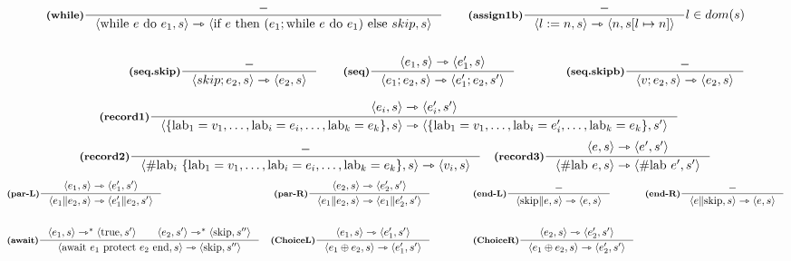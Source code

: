 \documentclass[a4paper, 10pt]{article}
\newcommand{\infer}[4]{\inference[\textbf{#1}]{#2}{#3}#4 }
\newcommand{\srule}[2]{\langle #1 \rangle \rightarrowtriangle \langle #2 \rangle}
\newcommand{\ssrule}[2]{\langle #1 \rangle \rightarrowtriangle^{*} \langle #2 \rangle}
\newcommand{\memrep}[3]{#1 \lbrack #2 \mapsto #3 \rbrack}
\begin{document}
	\begin{align*}
		\infer{(while)}{-}{\srule{\text{while } e \text{ do } e_1, s}{\text{if } e \text{ then } (e_1; \text{while } e \text{ do } e_1) \text{ else } skip, s}}{}\qquad
		\infer{(assign1b)}{-}{\srule{l:=n,s}{n, \memrep{s}{l}{n}}}{l \in dom(s)} \\ \\
		\infer{(seq.skip)}{-}{\srule{skip;e_2,s}{e_2,s}}{}\qquad
		\infer{(seq)}{\srule{e_1,s}{e_1',s}}{\srule{e_1;e_2,s}{e_1';e_2,s'}}{}\qquad\qquad
		\infer{(seq.skipb)}{-}{\srule{v;e_2,s}{e_2,s}}{}
	\end{align*}
	\newpage
	\begin{minipage}{.45\linewidth}
		\begin{flushleft}
			\begin{align*}
				&\infer{(record1)}{\srule{e_i, s}{e_i', s'}}{\srule{\{\text{lab}_1 = v_1, \dots, \text{lab}_i = e_i, \dots, \text{lab}_k = e_k \}, s}{\{\text{lab}_1 = v_1, \dots, \text{lab}_i = e_i', \dots, \text{lab}_k = e_k \}, s'}}{}
			\end{align*}
			\begin{align*}
				&\infer{(record2)}{-}{\srule{\# \text{lab}_i\ \{\text{lab}_1 = v_1, \dots, \text{lab}_i = e_i, \dots, \text{lab}_k = e_k \}, s}{v_i, s}}{}
				&\infer{(record3)}{\srule{e, s}{e', s'}}{\srule{\# \text{lab } e, s}{\# \text{lab } e', s'}}{}
			\end{align*}
			\begin{align*}
				&\infer{(par-L)}{\srule{e_1,s}{e_1', s'}}{\srule{e_1\| e_2, s}{e_1'\| e_2 , s'}}{}
				&\infer{(par-R)}{\srule{e_2,s}{e_2', s'}}{\srule{e_1\| e_2, s}{e_1\| e_2' , s'}}{}\qquad\qquad
				&\infer{(end-L)}{-}{\srule{\textup{skip}\| e, s}{e , s}}{}
				&\infer{(end-R)}{-}{\srule{e \| \textup{skip}, s}{e , s}}{} \\ \\
				&\infer{(await)}{\ssrule{e_1, s}{\textup{true}, s'}\qquad \ssrule{e_2, s'}{\textup{skip}, s''}}{
					\srule{\textup{await}\ e_1\ \textup{protect}\ e_2\ \textup{end}, s}{\textup{skip}, s''}}{}  
				&\infer{(ChoiceL)}{\srule{e_1, s}{e_1', s'}}{\srule{e_1 \oplus e_2, s}{e_1', s'}}{} \qquad\qquad
				&\infer{(ChoiceR)}{\srule{e_2, s}{e_2', s'}}{\srule{e_1 \oplus e_2, s}{e_2', s'}}{} 
			\end{align*}
		

\end{flushleft}
\end{minipage}
\end{document}
